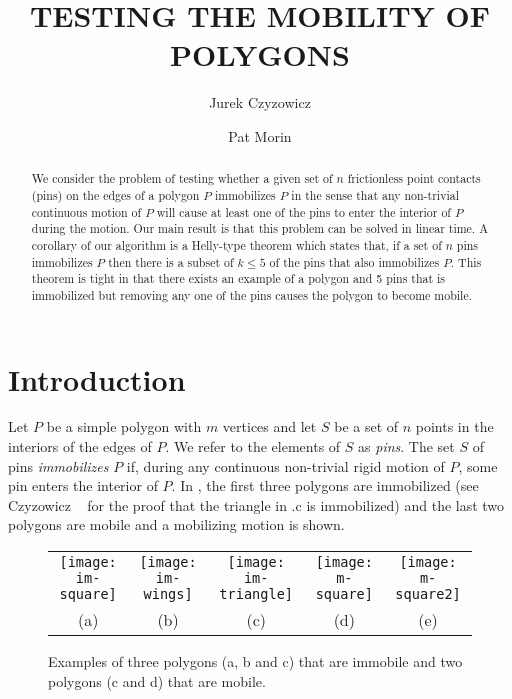 \documentclass[lotsofwhite,charterfonts]{patmorin}
\title{\MakeUppercase{Testing the Mobility of Polygons}}
\author{Jurek Czyzowicz \and Pat Morin}
\date{}
\begin{document}
\maketitle

\begin{abstract}
We consider the problem of testing whether a given set of $n$ frictionless
point contacts (pins) on the edges of a polygon $P$ immobilizes $P$ in the
sense that any non-trivial continuous motion of $P$ will cause at least one of
the pins to enter the interior of $P$ during the motion.  Our main result is
that this problem can be solved in linear time.  A corollary of our algorithm
is a Helly-type theorem which states that, if a set of $n$ pins immobilizes $P$
then there is a subset of $k\le 5$ of the pins that also immobilizes $P$.  This
theorem is tight in that there exists an example of a polygon and 5 pins that
is immobilized but removing any one of the pins causes the polygon to become
mobile. 
\end{abstract}

\section{Introduction}

Let $P$ be a simple polygon with $m$ vertices and let $S$ be a set of
$n$ points in the interiors of the edges of $P$.  We refer to the
elements of $S$ as \emph{pins}.  The set $S$ of pins
\emph{immobilizes} $P$ if, during any continuous non-trivial rigid
motion of $P$, some pin enters the interior of $P$.  In
, the first three polygons are immobilized (see
Czyzowicz \etal\ \cite{X} for the proof that the triangle in
.c is immobilized) and the last two polygons are
mobile and a mobilizing motion is shown.

\begin{figure}
\begin{center}\begin{tabular}{ccccc}
\texttt{[image: im-square]} &
\texttt{[image: im-wings]} &
\texttt{[image: im-triangle]} &
\texttt{[image: m-square]} &
\texttt{[image: m-square2]} \\
(a) & (b) & (c) & (d) & (e)
\end{tabular}\end{center}
\caption{Examples of three polygons (a, b and c) that are immobile and two polygons
(c and d) that are mobile.}
\end{figure}
\end{document}
